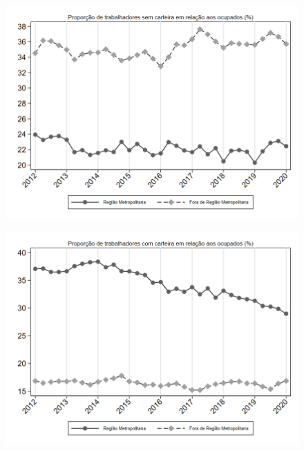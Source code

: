 \begin{frame}[label=_composicao_demografica_regiao_metro_prop_empregadoSC]{}
\textit{\hyperlink{_composicao_demografica_regiao_metro}{}}
\begin{figure}
  \centering
  \includegraphics[width=1.0\linewidth]{../../analysis/output/composicao_demografica/area_geografica/_composicao_demografica_regiao_metro_prop_empregadoSC.png}
  \caption{}
  \label{fig:_composicao_demografica_regiao_metro_prop_empregadoSC}
\end{figure}
\end{frame}

\begin{frame}[label=_composicao_demografica_regiao_metro_prop_empregadoCC]{}
\textit{\hyperlink{_composicao_demografica_regiao_metro}{}}
\begin{figure}
  \centering
  \includegraphics[width=1.0\linewidth]{../../analysis/output/composicao_demografica/area_geografica/_composicao_demografica_regiao_metro_prop_empregadoCC.png}
  \caption{}
  \label{fig:_composicao_demografica_regiao_metro_prop_empregadoCC}
\end{figure}
\end{frame}

